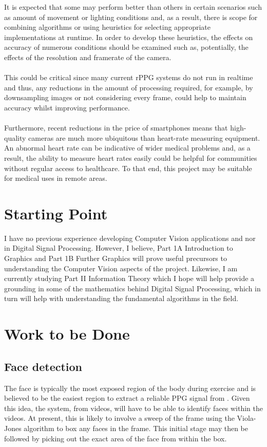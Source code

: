 It is expected that some may perform better than others in certain scenarios such as amount of movement or lighting conditions and, as a result, there is scope for combining algorithms or using heuristics for selecting appropriate implementations at runtime. In order to develop these heuristics, the effects on accuracy of numerous conditions should be examined such as, potentially, the effects of the resolution and framerate of the camera. \\ \\
This could be critical since many current rPPG systems do not run in realtime and thus, any reductions in the amount of processing required, for example, by downsampling images or not considering every frame, could help to maintain accuracy whilst improving performance. \\\\
Furthermore, recent reductions in the price of smartphones means that high-quality cameras are much more ubiquitous than heart-rate measuring equipment. An abnormal heart rate can be indicative of wider medical problems and, as a result, the ability to measure heart rates easily could be helpful for communities without regular access to healthcare. To that end, this project may be suitable for medical uses in remote areas.

\section*{Starting Point}
I have no previous experience developing Computer Vision applications and nor in Digital Signal Processing. However, I believe, Part 1A Introduction to Graphics and Part 1B Further Graphics will prove useful precursors to understanding the Computer Vision aspects of the project. Likewise, I am currently studying Part II Information Theory which I hope will help provide a grounding in some of the mathematics behind Digital Signal Processing, which in turn will help with understanding the fundamental algorithms in the field.

\section*{Work to be Done}
\subsection*{Face detection}
The face is typically the most exposed region of the body during exercise and is believed to be the easiest region to extract a reliable PPG signal from \cite{vanderKooij2019}. Given this idea, the system, from videos, will have to be able to identify faces within the videos. At present, this is likely to involve a sweep of the frame using the Viola-Jones algorithm to box any faces in the frame. This initial stage may then be followed by picking out the exact area of the face from within the box.

